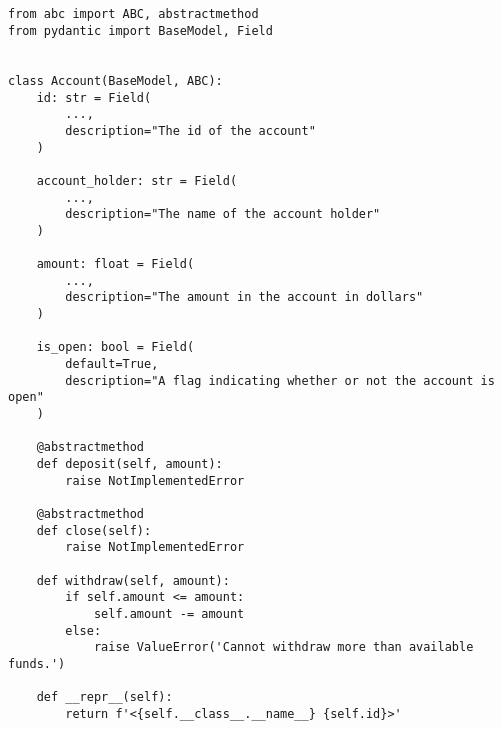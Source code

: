 \documentclass[12pt]{article}
\begin{document}
    \begin{verbatim}


from abc import ABC, abstractmethod
from pydantic import BaseModel, Field


class Account(BaseModel, ABC):
    id: str = Field(
        ...,
        description="The id of the account"
    )

    account_holder: str = Field(
        ...,
        description="The name of the account holder"
    )

    amount: float = Field(
        ...,
        description="The amount in the account in dollars"
    )

    is_open: bool = Field(
        default=True,
        description="A flag indicating whether or not the account is open"
    )

    @abstractmethod
    def deposit(self, amount):
        raise NotImplementedError

    @abstractmethod
    def close(self):
        raise NotImplementedError

    def withdraw(self, amount):
        if self.amount <= amount:
            self.amount -= amount
        else:
            raise ValueError('Cannot withdraw more than available funds.')

    def __repr__(self):
        return f'<{self.__class__.__name__} {self.id}>'
    \end{verbatim}
\end{document}
